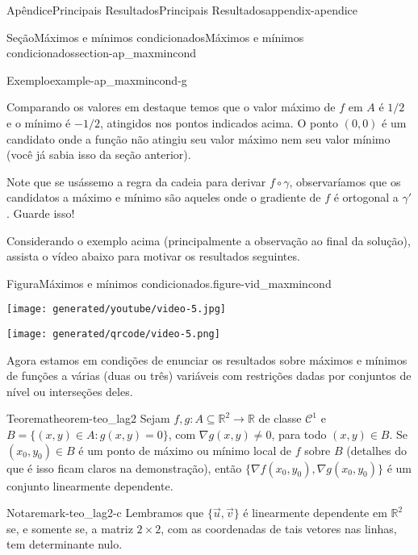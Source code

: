 \documentclass[oneside,10pt,]{book}
\numberwithin{equation}{section}
\newcommand{\R}{\mathbb R}
\begin{document}
\begin{appendixptx}{Apêndice}{Principais Resultados}{}{Principais Resultados}{}{}{appendix-apendice}
\begin{sectionptx}{Seção}{Máximos e mínimos condicionados}{}{Máximos e mínimos condicionados}{}{}{section-ap_maxmincond}
\begin{example}{Exemplo}{}{example-ap_maxmincond-g}
\begin{equation*}
\end{equation*}
%
\par
Comparando os valores em destaque temos que o valor máximo de \(f\) em \(A\) é \(1/2\) e o mínimo é \(-1/2\), atingidos nos pontos indicados acima. O ponto \((0,0)\) é um candidato onde a função não atingiu seu valor máximo nem seu valor mínimo (você já sabia isso da seção anterior).%
\par
Note que se usássemo a regra da cadeia para derivar \(f\circ\gamma\), observaríamos que os candidatos a máximo e mínimo são aqueles onde o gradiente de \(f\) é ortogonal a \(\gamma'\). Guarde isso!%
\end{example}
Considerando o exemplo acima (principalmente a observação ao final da solução), assista o vídeo abaixo para motivar os resultados seguintes. \begin{figureptx}{Figura}{Máximos e mínimos condicionados.}{figure-vid_maxmincond}{}%
\begin{sidebyside}{2}{0.075}{0.075}{0.17}%
\begin{sbspanel}{0.47}%
\texttt{[image: generated/youtube/video-5.jpg]}
\end{sbspanel}%
\begin{sbspanel}{0.21}%
\texttt{[image: generated/qrcode/video-5.png]}
\end{sbspanel}%
\end{sidebyside}%
\tcblower
\end{figureptx}%
%
\par
Agora estamos em condições de enunciar os resultados sobre máximos e mínimos de funções a várias (duas ou três) variáveis com restrições dadas por conjuntos de nível ou interseções deles.%
\begin{theorem}{Teorema}{}{}{theorem-teo_lag2}%
Sejam \(f,g\colon A\subseteq\R^2\to\R\) de classe \(\mathscr{C}^1\) e \(B=\big\{(x,y)\in A\colon
g(x,y)=0\big\}\), com \(\nabla g(x,y)\neq 0\), para todo \((x,y)\in B\). Se \((x_0,y_0)\in B\) é um ponto de máximo ou mínimo local de \(f\) sobre \(B\) (detalhes do que é isso ficam claros na demonstração), então \(\big\{\nabla
f(x_0,y_0),\nabla g(x_0,y_0)\big\}\) é um conjunto linearmente dependente.\begin{remark}{Nota}{}{remark-teo_lag2-c}%
Lembramos que \(\{\vec{u},\vec{v}\}\) é linearmente dependente em \(\R^2\) se, e somente se, a matriz \(2\times
2\), com as coordenadas de tais vetores nas linhas, tem determinante nulo.\end{remark}
\end{theorem}

\end{sectionptx}
\end{appendixptx}
\end{document}
